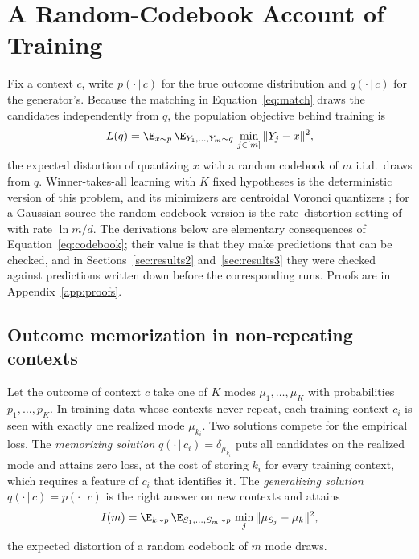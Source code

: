 \section{A Random-Codebook Account of \Nom{} Training}
\label{sec:theory}

Fix a context $c$, write $p(\cdot\,|\,c)$ for the true outcome distribution and $q(\cdot\,|\,c)$ for the generator's. Because the matching in Equation~\ref{eq:match} draws the candidates independently from $q$, the population objective behind \nom{} training is
\begin{equation}
L(q) = \E_{x \sim p}\, \E_{Y_1,\dots,Y_m \sim q}\, \min_{j \in [m]} \| Y_j - x \|^2 ,
\label{eq:codebook}
\end{equation}
the expected distortion of quantizing $x$ with a random codebook of $m$ i.i.d.\ draws from $q$. Winner-takes-all learning with $K$ fixed hypotheses is the deterministic version of this problem, and its minimizers are centroidal Voronoi quantizers \citep{rupprecht2017mhp,letzelter2024wta}; for a Gaussian source the random-codebook version is the rate--distortion setting of \citet{shannon1959coding} with rate $\ln m / d$. The derivations below are elementary consequences of Equation~\ref{eq:codebook}; their value is that they make predictions that can be checked, and in Sections~\ref{sec:results2} and~\ref{sec:results3} they were checked against predictions written down before the corresponding runs. Proofs are in Appendix~\ref{app:proofs}.

\subsection{Outcome memorization in non-repeating contexts}
\label{sec:theory_memo}
Let the outcome of context $c$ take one of $K$ modes $\mu_1,\dots,\mu_K$ with probabilities $p_1,\dots,p_K$. In training data whose contexts never repeat, each training context $c_i$ is seen with exactly one realized mode $\mu_{k_i}$. Two solutions compete for the empirical loss. The \emph{memorizing solution} $q(\cdot\,|\,c_i) = \delta_{\mu_{k_i}}$ puts all candidates on the realized mode and attains zero loss, at the cost of storing $k_i$ for every training context, which requires a feature of $c_i$ that identifies it. The \emph{generalizing solution} $q(\cdot\,|\,c) = p(\cdot\,|\,c)$ is the right answer on new contexts and attains
\begin{equation}
I(m) = \E_{k \sim p}\, \E_{S_1,\dots,S_m \sim p}\, \min_{j} \| \mu_{S_j} - \mu_k \|^2 ,
\label{eq:I}
\end{equation}
the expected distortion of a random codebook of $m$ mode draws.

